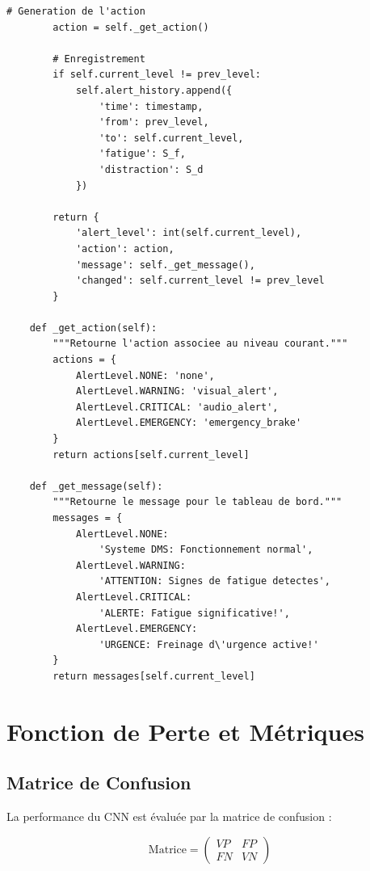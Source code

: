 \begin{lstlisting}[style=pythonstyle, caption={Module de logique décisionnelle ECU.}, label={lst:ecu}]
        # Generation de l'action
        action = self._get_action()
        
        # Enregistrement
        if self.current_level != prev_level:
            self.alert_history.append({
                'time': timestamp,
                'from': prev_level,
                'to': self.current_level,
                'fatigue': S_f,
                'distraction': S_d
            })
        
        return {
            'alert_level': int(self.current_level),
            'action': action,
            'message': self._get_message(),
            'changed': self.current_level != prev_level
        }
    
    def _get_action(self):
        """Retourne l'action associee au niveau courant."""
        actions = {
            AlertLevel.NONE: 'none',
            AlertLevel.WARNING: 'visual_alert',
            AlertLevel.CRITICAL: 'audio_alert',
            AlertLevel.EMERGENCY: 'emergency_brake'
        }
        return actions[self.current_level]
    
    def _get_message(self):
        """Retourne le message pour le tableau de bord."""
        messages = {
            AlertLevel.NONE: 
                'Systeme DMS: Fonctionnement normal',
            AlertLevel.WARNING: 
                'ATTENTION: Signes de fatigue detectes',
            AlertLevel.CRITICAL: 
                'ALERTE: Fatigue significative!',
            AlertLevel.EMERGENCY: 
                'URGENCE: Freinage d\'urgence active!'
        }
        return messages[self.current_level]
\end{lstlisting}

\section{Fonction de Perte et Métriques}

\subsection{Matrice de Confusion}

La performance du CNN est évaluée par la matrice de confusion :

\begin{equation}
\text{Matrice} = \begin{pmatrix} VP & FP \\ FN & VN \end{pmatrix}
\label{eq:confusion_matrix}
\end{equation}

